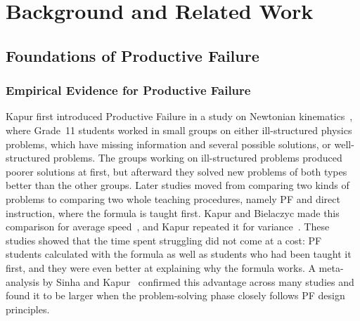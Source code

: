 \chapter{Background and Related Work}
\label{chap:background}

\section{Foundations of Productive Failure}
\label{sec:bg-pf-theory}

\subsection{Empirical Evidence for Productive Failure}
\label{subsec:bg-pf-evidence}
Kapur first introduced Productive Failure in a study on Newtonian kinematics~\cite{kapur2008}, where Grade~11 students worked in small groups on either ill-structured physics problems, which have missing information and several possible solutions, or well-structured problems. The groups working on ill-structured problems produced poorer solutions at first, but afterward they solved new problems of both types better than the other groups. Later studies moved from comparing two kinds of problems to comparing two whole teaching procedures, namely PF and direct instruction, where the formula is taught first. Kapur and Bielaczyc made this comparison for average speed~\cite{kapur2012}, and Kapur repeated it for variance~\cite{kapur2014}. These studies showed that the time spent struggling did not come at a cost: PF students calculated with the formula as well as students who had been taught it first, and they were even better at explaining why the formula works. A meta-analysis by Sinha and Kapur~\cite{sinha2021} confirmed this advantage across many studies and found it to be larger when the problem-solving phase closely follows PF design principles. 

